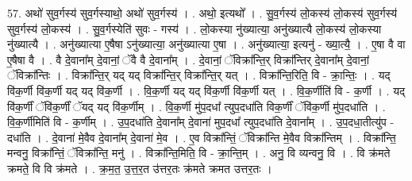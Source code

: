 \documentclass[17pt]{extarticle}
\begin{document}
57. अथो॑ सुव॒र्गस्य॑ सुव॒र्गस्याथो॒ अथो॑ सुव॒र्गस्य॑ । . अथो॒ इत्यथो᳚ । . सु॒व॒र्गस्य॑ लो॒कस्य॑ लो॒कस्य॑ सुव॒र्गस्य॑ सुव॒र्गस्य॑ लो॒कस्य॑ । . सु॒व॒र्गस्येति॑ सुवः - गस्य॑ । . लो॒कस्या नु॑ख्यात्या॒ अनु॑ख्यात्यै लो॒कस्य॑ लो॒कस्या नु॑ख्यात्यै । . अनु॑ख्यात्या ए॒षैषा ऽनु॑ख्यात्या॒ अनु॑ख्यात्या ए॒षा । . अनु॑ख्यात्या॒ इत्यनु॑ - ख्या॒त्यै॒ । . ए॒षा वै वा ए॒षैषा वै । . वै दे॒वाना᳚म् दे॒वानां॒ ॅवै वै दे॒वाना᳚म् । . दे॒वानां॒ ॅविक्रा᳚न्ति॒र् विक्रा᳚न्तिर् दे॒वाना᳚म् दे॒वानां॒ ॅविक्रा᳚न्तिः । . विक्रा᳚न्ति॒र् यद् यद् विक्रा᳚न्ति॒र् विक्रा᳚न्ति॒र् यत् । . विक्रा᳚न्ति॒रिति॒ वि - क्रा॒न्तिः॒ । . यद् वि॑क॒र्णी वि॑क॒र्णी यद् यद् वि॑क॒र्णी । . वि॒क॒र्णी यद् यद् वि॑क॒र्णी वि॑क॒र्णी यत् । . वि॒क॒र्णीति॑ वि - क॒र्णी । . यद् वि॑क॒र्णीं ॅवि॑क॒र्णीं ॅयद् यद् वि॑क॒र्णीम् । . वि॒क॒र्णी मु॑प॒दधा᳚ त्युप॒दधा॑ति विक॒र्णीं ॅवि॑क॒र्णी मु॑प॒दधा॑ति । . वि॒क॒र्णीमिति॑ वि - क॒र्णीम् । . उ॒प॒दधा॑ति दे॒वाना᳚म् दे॒वाना॑ मुप॒दधा᳚ त्युप॒दधा॑ति दे॒वाना᳚म् । . उ॒प॒दधा॒तीत्यु॑प - दधा॑ति । . दे॒वाना॑ मे॒वैव दे॒वाना᳚म् दे॒वाना॑ मे॒व । . ए॒व विक्रा᳚न्तिं॒ ॅविक्रा᳚न्ति मे॒वैव विक्रा᳚न्तिम् । . विक्रा᳚न्ति॒ मन्वनु॒ विक्रा᳚न्तिं॒ ॅविक्रा᳚न्ति॒ मनु॑ । . विक्रा᳚न्ति॒मिति॒ वि - क्रा॒न्ति॒म् । . अनु॒ वि व्यन्वनु॒ वि । . वि क्र॑मते क्रमते॒ वि वि क्र॑मते । . क्र॒म॒त॒ उ॒त्त॒र॒त उ॑त्तर॒तः क्र॑मते क्रमत उत्तर॒तः । \newline
\end{document}

